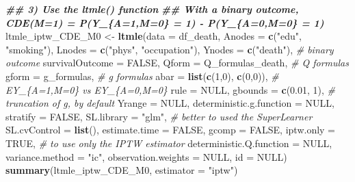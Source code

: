 \documentclass[
]{book}
\newenvironment{Shaded}{\begin{snugshade}}{\end{snugshade}}
\newcommand{\AttributeTok}[1]{\textcolor[rgb]{0.13,0.29,0.53}{#1}}
\newcommand{\CommentTok}[1]{\textcolor[rgb]{0.56,0.35,0.01}{\textit{#1}}}
\newcommand{\ConstantTok}[1]{\textcolor[rgb]{0.56,0.35,0.01}{#1}}
\newcommand{\DecValTok}[1]{\textcolor[rgb]{0.00,0.00,0.81}{#1}}
\newcommand{\DocumentationTok}[1]{\textcolor[rgb]{0.56,0.35,0.01}{\textbf{\textit{#1}}}}
\newcommand{\FloatTok}[1]{\textcolor[rgb]{0.00,0.00,0.81}{#1}}
\newcommand{\FunctionTok}[1]{\textcolor[rgb]{0.13,0.29,0.53}{\textbf{#1}}}
\newcommand{\NormalTok}[1]{#1}
\newcommand{\OtherTok}[1]{\textcolor[rgb]{0.56,0.35,0.01}{#1}}
\newcommand{\StringTok}[1]{\textcolor[rgb]{0.31,0.60,0.02}{#1}}
\begin{document}
\begin{Shaded}
\begin{Highlighting}[]
\DocumentationTok{\#\# 3) Use the ltmle() function}
\DocumentationTok{\#\# With a binary outcome, CDE(M=1) = P(Y\_\{A=1,M=0\} = 1) {-} P(Y\_\{A=0,M=0\} = 1)}
\NormalTok{ltmle\_iptw\_CDE\_M0 }\OtherTok{\textless{}{-}} \FunctionTok{ltmle}\NormalTok{(}\AttributeTok{data =}\NormalTok{ df\_death,}
                           \AttributeTok{Anodes =} \FunctionTok{c}\NormalTok{(}\StringTok{"edu"}\NormalTok{, }\StringTok{"smoking"}\NormalTok{),}
                           \AttributeTok{Lnodes =} \FunctionTok{c}\NormalTok{(}\StringTok{"phys"}\NormalTok{, }\StringTok{"occupation"}\NormalTok{),}
                           \AttributeTok{Ynodes =} \FunctionTok{c}\NormalTok{(}\StringTok{"death"}\NormalTok{), }\CommentTok{\# binary outcome}
                           \AttributeTok{survivalOutcome =} \ConstantTok{FALSE}\NormalTok{,}
                           \AttributeTok{Qform =}\NormalTok{ Q\_formulas\_death, }\CommentTok{\# Q formulas}
                           \AttributeTok{gform =}\NormalTok{ g\_formulas, }\CommentTok{\# g formulas}
                           \AttributeTok{abar =} \FunctionTok{list}\NormalTok{(}\FunctionTok{c}\NormalTok{(}\DecValTok{1}\NormalTok{,}\DecValTok{0}\NormalTok{),}
                                       \FunctionTok{c}\NormalTok{(}\DecValTok{0}\NormalTok{,}\DecValTok{0}\NormalTok{)), }\CommentTok{\# EY\_\{A=1,M=0\} vs EY\_\{A=0,M=0\}}
                           \AttributeTok{rule =} \ConstantTok{NULL}\NormalTok{,}
                           \AttributeTok{gbounds =} \FunctionTok{c}\NormalTok{(}\FloatTok{0.01}\NormalTok{, }\DecValTok{1}\NormalTok{), }\CommentTok{\# truncation of g, by default}
                           \AttributeTok{Yrange =} \ConstantTok{NULL}\NormalTok{,}
                           \AttributeTok{deterministic.g.function =} \ConstantTok{NULL}\NormalTok{,}
                           \AttributeTok{stratify =} \ConstantTok{FALSE}\NormalTok{,}
                           \AttributeTok{SL.library =} \StringTok{"glm"}\NormalTok{, }\CommentTok{\# better to used the SuperLearner}
                           \AttributeTok{SL.cvControl =} \FunctionTok{list}\NormalTok{(),}
                           \AttributeTok{estimate.time =} \ConstantTok{FALSE}\NormalTok{,}
                           \AttributeTok{gcomp =} \ConstantTok{FALSE}\NormalTok{, }
                           \AttributeTok{iptw.only =} \ConstantTok{TRUE}\NormalTok{, }\CommentTok{\# to use only the IPTW estimator}
                           \AttributeTok{deterministic.Q.function =} \ConstantTok{NULL}\NormalTok{,}
                           \AttributeTok{variance.method =} \StringTok{"ic"}\NormalTok{,}
                           \AttributeTok{observation.weights =} \ConstantTok{NULL}\NormalTok{,}
                           \AttributeTok{id =} \ConstantTok{NULL}\NormalTok{)}
\FunctionTok{summary}\NormalTok{(ltmle\_iptw\_CDE\_M0, }\AttributeTok{estimator =} \StringTok{"iptw"}\NormalTok{)}
\end{Highlighting}
\end{Shaded}
\end{document}
